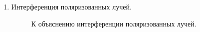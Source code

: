 \begin{enumerate}
    \item Интерференция поляризованных лучей.
    \begin{figure}[h!]
        \noindent{}
        \caption{К объяснению интерференции поляризованных лучей.}
    \end{figure} \\
    
\end{enumerate}